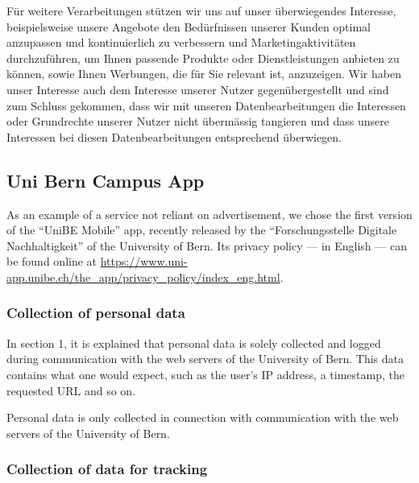 \documentclass[a4paper]{scrreprt}
\begin{document}
\begin{displayquote}
		Für weitere Verarbeitungen stützen wir uns auf unser überwiegendes
		Interesse, beispielsweise unsere Angebote den Bedürfnissen unserer
		Kunden optimal anzupassen und kontinuierlich zu verbessern und
		Marketingaktivitäten durchzuführen, um Ihnen passende Produkte oder
		Dienstleistungen anbieten zu können, sowie Ihnen Werbungen, die für Sie
		relevant ist, anzuzeigen. \textelp{}
		Wir haben unser Interesse auch dem Interesse unserer Nutzer
		gegenübergestellt und sind zum Schluss gekommen, dass wir mit unseren
		Datenbearbeitungen die Interessen oder Grundrechte unserer Nutzer nicht
		übermässig tangieren und dass unsere Interessen bei diesen
		Datenbearbeitungen entsprechend überwiegen.
\end{displayquote}

\subsection{Uni Bern Campus App}

As an example of a service not reliant on advertisement, we chose the first
version of the ``UniBE Mobile'' app, recently released by the
``Forschungsstelle Digitale Nachhaltigkeit'' of the University of Bern. Its
privacy policy --- in English --- can be found online at
\url{https://www.uni-app.unibe.ch/the_app/privacy_policy/index_eng.html}.
\autocite{universityofbernUniBEMobilePrivacy}

\subsubsection{Collection of personal data}

In section 1, it is explained that personal data is solely collected and logged
during communication with the web servers of the University of Bern. This data
contains what one would expect, such as the user's IP address, a timestamp, the
requested URL and so on.

\begin{displayquote}
		Personal data is only collected in connection with communication with
		the web servers of the University of Bern.
\end{displayquote}

\subsubsection{Collection of data for tracking}
\end{document}
